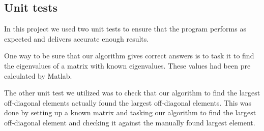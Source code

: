 \subsection{Unit tests}

In this project we used two unit tests to ensure that the program performs as expected and delivers accurate enough results. 

One way to be sure that our algorithm gives correct answers is to task it to find the eigenvalues of a matrix with known eigenvalues. These values had been pre calculated by Matlab. 

The other unit test we utilized was to check that our algorithm to find the largest off-diagonal elements actually found the largest off-diagonal elements. This was done by setting up a known matrix and tasking our algorithm to find the largest off-diagonal element and checking it against the manually found largest element. 






